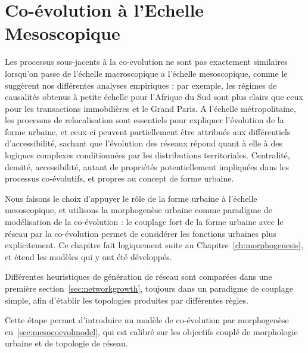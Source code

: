

\chapter{Co-évolution à l'Echelle Mesoscopique}


\label{ch:mesocoevolution} 




Les processus sous-jacents à la co-evolution ne sont pas exactement similaires lorsqu'on passe de l'échelle macroscopique a l'échelle mesoscopique, comme le suggèrent nos différentes analyses empiriques : par exemple, les régimes de causalités obtenus à petite échelle pour l'Afrique du Sud sont plus clairs que ceux pour les transactions immobilières et le Grand Paris. A l'échelle métropolitaine, les processus de relocalisation sont essentiels pour expliquer l'évolution de la forme urbaine, et ceux-ci peuvent partiellement être attribués aux différentiels d'accessibilité, sachant que l'évolution des réseaux répond quant à elle à des logiques complexes conditionnées par les distributions territoriales. Centralité, densité, accessibilité, autant de propriétés potentiellement impliquées dans les processus co-évolutifs, et propres au concept de forme urbaine.


Nous faisons le choix d'appuyer le rôle de la forme urbaine à l'échelle mesoscopique, et utilisons la morphogenèse urbaine comme paradigme de modélisation de la co-évolution : le couplage fort de la forme urbaine avec le réseau par la co-évolution permet de considérer les fonctions urbaines plus explicitement. Ce chapitre fait logiquement suite au Chapitre~\ref{ch:morphogenesis}, et étend les modèles qui y ont été développés.

Différentes heuristiques de génération de réseau sont comparées dans une première section~\ref{sec:networkgrowth}, toujours dans un paradigme de couplage simple, afin d'établir les topologies produites par différentes règles.

Cette étape permet d'introduire un modèle de co-évolution par morphogenèse en~\ref{sec:mesocoevolmodel}, qui est calibré sur les objectifs couplé de morphologie urbaine et de topologie de réseau.

